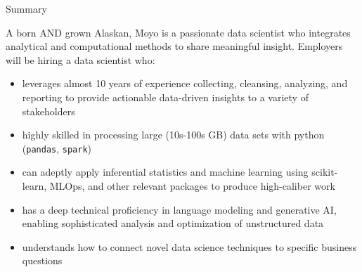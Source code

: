 \documentclass{resume} %
\begin{document}

\begin{rSection}{Summary}

A born AND grown Alaskan, Moyo is a passionate data scientist who integrates analytical and computational methods to share meaningful insight. Employers will be hiring a data scientist who:
{\begin{itemize}
    \item {leverages almost 10 years of experience collecting, cleansing, analyzing, and reporting to provide actionable data-driven insights to a variety of stakeholders}
    \item {highly skilled in processing large (10s-100s GB) data sets with python (\texttt{pandas}, \texttt{spark})}
    \item {can adeptly apply inferential statistics and machine learning using scikit-learn, MLOps, and other relevant packages to produce high-caliber work}
    \item {has a deep technical proficiency in language modeling and generative AI, enabling sophisticated analysis and optimization of unstructured data}
    \item {understands how to connect novel data science techniques to specific business questions}
\end{itemize} }

\end{rSection}

\end{document}
